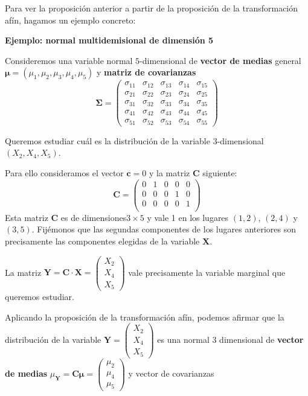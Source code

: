 \documentclass[
  letterpaper,
  DIV=11,
  numbers=noendperiod]{scrreprt}
\begin{document}
Para ver la proposición anterior a partir de la proposición de la
transformación afín, hagamos un ejemplo concreto:

\textbf{Ejemplo: normal multidemisional de dimensión 5}

Consideremos una variable normal \(5\)-dimensional de \textbf{vector de
medias} general \(\mathbf{\mu}=(\mu_1,\mu_2,\mu_3,\mu_4,\mu_5)\) y
\textbf{matriz de covarianzas} \[
\mathbf{\Sigma}=\begin{pmatrix}
\sigma_{11} & \sigma_{12} & \sigma_{13} & \sigma_{14} & \sigma_{15} \\
\sigma_{21} & \sigma_{22} & \sigma_{23} & \sigma_{24} & \sigma_{25} \\
\sigma_{31} & \sigma_{32} & \sigma_{33} & \sigma_{34} & \sigma_{35} \\
\sigma_{41} & \sigma_{42} & \sigma_{43} & \sigma_{44} & \sigma_{45} \\
\sigma_{51} & \sigma_{52} & \sigma_{53} & \sigma_{54} & \sigma_{55} 
\end{pmatrix}
\]

Queremos estudiar cuál es la distribución de la variable
\(3\)-dimensional \((X_2,X_4,X_5)\).

Para ello consideramos el vector \(\mathbf{c}=0\) y la matriz
\(\mathbf{C}\) siguiente: \[
\mathbf{C}=\begin{pmatrix}
0 & 1 & 0 & 0 & 0 \\
0 & 0 & 0 & 1 & 0 \\
0 & 0 & 0 & 0 & 1 \\
\end{pmatrix}
\] Esta matriz \(\mathbf{C}\) es de dimensiones\(3\times 5\) y vale 1 en
los lugares \((1,2)\), \((2,4)\) y \((3,5)\). Fijémonos que las segundas
componentes de los lugares anteriores son precisamente las componentes
elegidas de la variable \(\mathbf{X}\).

La matriz
\(\mathbf{Y}=\mathbf{C}\cdot \mathbf{X}=\begin{pmatrix}X_2\\X_4\\X_5\end{pmatrix}\)
vale precisamente la variable marginal que queremos estudiar.

Aplicando la proposición de la transformación afín, podemos afirmar que
la distribución de la variable
\(\mathbf{Y}=\begin{pmatrix}X_2\\X_4\\X_5\end{pmatrix}\) es una normal
\(3\) dimensional de \textbf{vector de medias}
\(\mu_{\mathbf{Y}}=\mathbf{C}\mathbf{\mu}=\begin{pmatrix}\mu_2\\\mu_4\\\mu_5\end{pmatrix}\)
y vector de covarianzas
\end{document}
